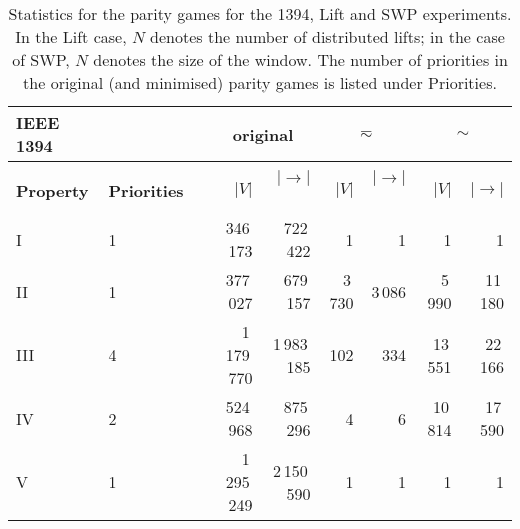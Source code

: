\documentclass[a4paper]{llncs}
\renewcommand{\sb}{\sim}
\newcommand{\stut}{\eqsim}\newcommand{\semistut}{\sim_{\mathrm{semi-st}}}
\begin{document}
\begin{table}[!ht]
  \centering
  \vspace{1em}
  \caption{Statistics for the parity games for the 1394, Lift and SWP
  experiments. In the Lift case, $N$ denotes the number of distributed
  lifts; in the case of SWP, $N$ denotes the size of the window. The
  number of priorities in the original (and minimised)
  parity games is listed under Priorities.}
  \label{tab:sizes}  
  \setlength{\tabcolsep}{3.5pt}
\begin{tabular}{lll||rr|rr|rr}\\
\textbf{IEEE 1394} & & &
\multicolumn{2}{c}{\textbf{original}} & \multicolumn{2}{c}{$\stut$} & \multicolumn{2}{c}{$\sb$} \\
\hline
\hline
& & & \\
\textbf{Property} & \textbf{Priorities} &  &
\textbf{$|V|$} & \textbf{$|{\to}|$~} & \textbf{$|V|$} & \textbf{$|{\to}|$~} & \textbf{$|V|$} & \textbf{$|{\to}|$} \\
\hline 
I & 1 &  & 346\,173 & 722\,422 & 1 & 1 & 1 & 1 \\ \hline 
 II & 1 &  & 377\,027 & 679\,157 & 3\,730 & 3\,086 & 5\,990 & 11\,180 \\ \hline 
 III & 4 &  & 1\,179\,770 & 1\,983\,185 & 102 & 334 & 13\,551 & 22\,166 \\ \hline 
 IV & 2 &  & 524\,968 & 875\,296 & 4 & 6 & 10\,814 & 17\,590 \\ \hline 
 V & 1 &  & 1\,295\,249 & 2\,150\,590 & 1 & 1 & 1 & 1  \\ \hline 


\end{tabular}
\end{table}
\end{document}

